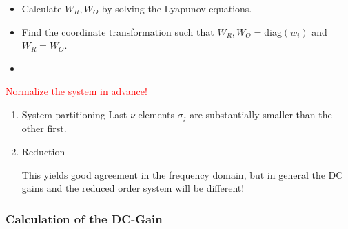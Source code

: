 \documentclass[10pt,a4paper]{scrartcl}
\begin{document}
\begin{multicols*}{3}
\begin{itemize}
\item Calculate $W_R,W_O$ by solving the Lyapunov equations.
\item Find the coordinate transformation such that $W_R,W_O=$diag$(w_i)$ and $W_R=W_O$.
\item {}
\end{itemize}

\textcolor{red}{Normalize the system in advance!}

\begin{enumerate}
\ncompaq
\item System partitioning
Last $\nu$ elements $\sigma_j$ are substantially smaller than the other first.

\item Reduction

This yields good agreement in the frequency domain, but in general the DC gains and the reduced order system will be different!

\end{enumerate}

\subsubsection{Calculation of the DC-Gain}


\end{multicols*}
\end{document}
